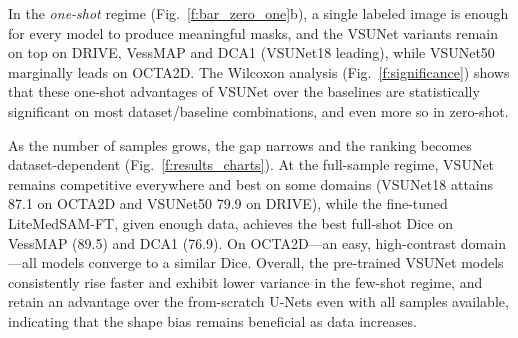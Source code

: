 \documentclass[twocolumn]{article}
\begin{document}
In the \emph{one-shot} regime (Fig.~\ref{f:bar_zero_one}b), a single labeled image is enough for every model to produce meaningful masks, and the VSUNet variants remain on top on DRIVE, VessMAP and DCA1 (VSUNet18 leading), while VSUNet50 marginally leads on OCTA2D. The Wilcoxon analysis (Fig.~\ref{f:significance}) shows that these one-shot advantages of VSUNet over the baselines are statistically significant on most dataset/baseline combinations, and even more so in zero-shot.

As the number of samples grows, the gap narrows and the ranking becomes dataset-dependent (Fig.~\ref{f:results_charts}). At the full-sample regime, VSUNet remains competitive everywhere and best on some domains (VSUNet18 attains 87.1 on OCTA2D and VSUNet50 79.9 on DRIVE), while the fine-tuned LiteMedSAM-FT, given enough data, achieves the best full-shot Dice on VessMAP (89.5) and DCA1 (76.9). On OCTA2D---an easy, high-contrast domain---all models converge to a similar Dice. Overall, the pre-trained VSUNet models consistently rise faster and exhibit lower variance in the few-shot regime, and retain an advantage over the from-scratch U-Nets even with all samples available, indicating that the shape bias remains beneficial as data increases.
\end{document}
